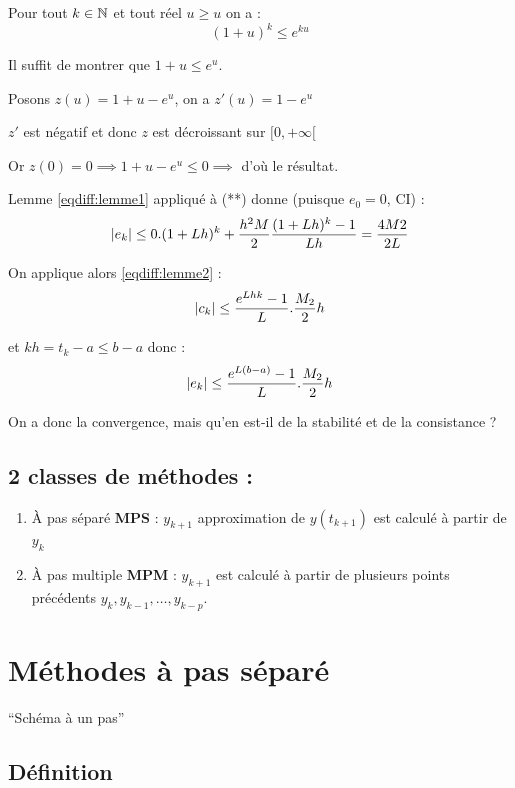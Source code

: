 \begin{lemme}
    Pour tout $k \in \mathbb{N}$ et tout réel $u \geq u$ on a :
    \[
        (1+u)^k \leq e^{ku}
    \]
    \label{eqdiff:lemme1}
\end{lemme}

\begin{preuve}
    Il suffit de montrer que $1+u \leq e^u$.

    Posons $z(u) = 1 + u - e^u$, on a $z'(u) = 1 - e^u$

    $z'$ est négatif et donc $z$ est décroissant sur $[0,+\infty[$

    Or $z(0) = 0 \implies 1 + u - e^u \leq 0 \implies$ d'où le résultat.
    \label{eqdiff:lemme2}
\end{preuve}

Lemme \ref{eqdiff:lemme1} appliqué à (**) donne (puisque $e_0 = 0$, CI) :
\[
    \left\lvert e_k\right\rvert \leq 0.(1+Lh)^k + \frac{h^2M}{2}\frac{(1+Lh)^k - 1}{Lh} = \frac{4M2}{2L}
\]

On applique alors \ref{eqdiff:lemme2} :
\[
    \left\lvert c_k\right\rvert \leq \frac{e^{Lhk}-1}{L}.\frac{M_2}{2}h
\]

et $kh=t_k-a \leq b-a$ donc :
\[
    \left\lvert e_k\right\rvert \leq \frac{e^{L(b-a)}-1}{L}.\frac{M_2}{2}h
\]

\hspace{1cm}

On a donc la convergence, mais qu'en est-il de la stabilité et de la consistance ?

\hspace{1cm}

\subsection*{2 classes de méthodes :}
\begin{enumerate}[label=(\arabic*)]
    \item À pas séparé \textbf{MPS} : $y_{k+1}$ approximation de $y(t_{k+1})$ est calculé à partir de $y_k$
    \item À pas multiple \textbf{MPM} : $y_{k+1}$ est calculé à partir de plusieurs
        points précédents $y_k,y_{k-1},\dots,y_{k-p}$.
\end{enumerate}

\section{Méthodes à pas séparé}
``Schéma à un pas''

\subsection{Définition}

